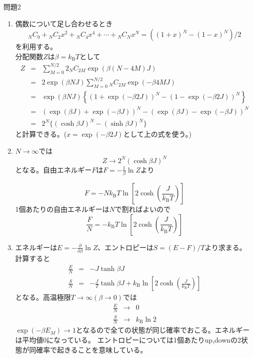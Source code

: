 \documentclass[fleqn]{jbook}
\begin{document}
\begin{answer}{問題2}{}
\begin{enumerate}
全部足すと
\[
2( {}_{N}C_{0} + {}_{N}C_{2} + {}_{N}C_{4} + \cdots + {}_{N}C_{N})=2^{N}
\]
が確かめられる。
\item 偶数について足し合わせるとき
\[
_{N}C_{0} + {}_{N}C_{2}x^{2} + {}_{N}C_{4}x^{4} + \cdots + {}_{N}C_{N}x^{N}=\left((1+x)^{N}-(1-x)^{N}\right)/2
\]
を利用する。\\
分配関数$Z$は$\beta=k_{\mathrm{B}}T$として
\begin{eqnarray*}
Z&=&\sum _{M=0}^{N/2} 2_{N}C_{2M}\exp(\beta (N-4M)J)\\
 &=&2\exp(\beta NJ)\sum _{M=0}^{N/2} {}_{N}C_{2M}\exp(-\beta 4MJ)\\
 &=&\exp(\beta NJ)\left\{ (1+\exp(-\beta 2J))^{N} - (1-\exp(-\beta 2J))^{N} \right\}\\
 &=&(\exp(\beta J)+\exp(-\beta J))^{N} - (\exp(\beta J)-\exp(-\beta J))^{N}\\
 &=&2^{N}\{ (\cosh \beta J)^{N}-(\sinh \beta J)^{N} \}
\end{eqnarray*}
と計算できる。($x=\exp(-\beta 2J)$として上の式を使う。)
\item $N\to \infty $では
\[
Z\to 2^{N} (\cosh \beta J)^{N}
\]
となる。自由エネルギー$F$は$F=-\frac{1}{\beta}\ln Z$より

\[
F=-Nk_{\mathrm{B}}T \ln\left[2\cosh(\frac{J}{k_{\mathrm{B}}T}) \right]
\]
1個あたりの自由エネルギーは$N$で割ればよいので
\[
\frac{F}{N}=-k_{\mathrm{B}}T \ln\left[2\cosh(\frac{J}{k_{\mathrm{B}}T}) \right]
\]
\item エネルギーは$E=-\frac{\partial}{\partial \beta}\ln Z$、エントロピーは$S=(E-F)/T$より求まる。
計算すると
\begin{eqnarray*}
\frac{E}{N}&=&-J\tanh \beta J\\
\frac{S}{N}&=&-\frac{J}{T}\tanh \beta J + k_{\mathrm{B}}\ln\left[2\cosh(\frac{J}{k_{\mathrm{B}}T}) \right]
\end{eqnarray*}
となる。高温極限$T\to \infty (\beta \to 0)$では
\begin{eqnarray*}
\frac{E}{N}&\to& 0\\
\frac{S}{N}&\to& k_{\mathrm{B}}\ln2
\end{eqnarray*}
$\exp(-\beta E_{M})\to 1$となるので全ての状態が同じ確率でおこる。エネルギーは平均値0になっている。
エントロピーについては1個あたりup,downの2状態が同確率で起きることを意味している。
\end{enumerate}


\end{answer}
\end{document}
